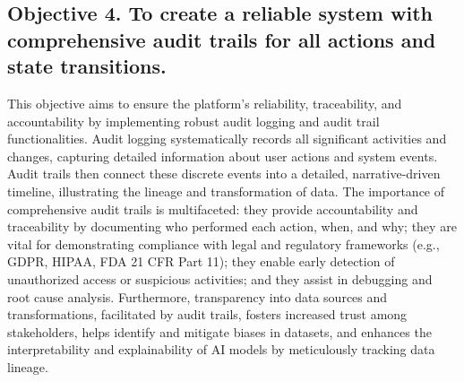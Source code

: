 \subsection*{Objective 4. To create a reliable system with comprehensive audit trails for all actions and state transitions.}
This objective aims to ensure the platform's reliability, traceability, and accountability by implementing robust audit logging and audit trail functionalities. Audit logging systematically records all significant activities and changes, capturing detailed information about user actions and system events. Audit trails then connect these discrete events into a detailed, narrative-driven timeline, illustrating the lineage and transformation of data. The importance of comprehensive audit trails is multifaceted: they provide accountability and traceability by documenting who performed each action, when, and why; they are vital for demonstrating compliance with legal and regulatory frameworks (e.g., GDPR, HIPAA, FDA 21 CFR Part 11); they enable early detection of unauthorized access or suspicious activities; and they assist in debugging and root cause analysis. Furthermore, transparency into data sources and transformations, facilitated by audit trails, fosters increased trust among stakeholders, helps identify and mitigate biases in datasets, and enhances the interpretability and explainability of AI models by meticulously tracking data lineage.